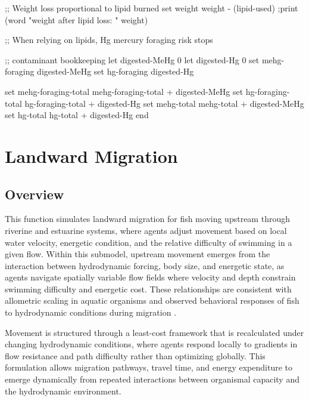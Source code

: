 \documentclass[
]{book}
\newenvironment{Shaded}{\begin{snugshade}}{\end{snugshade}}
\newcommand{\NormalTok}[1]{#1}
\begin{document}
\begin{Shaded}
\begin{Highlighting}[]
\NormalTok{  ;; Weight loss proportional to lipid burned}
\NormalTok{  set weight weight {-} (lipid{-}used)}
\NormalTok{  ;print (word "weight after lipid loss: " weight)}
  
\NormalTok{  ;; When relying on lipids, Hg mercury foraging risk stops}
    
\NormalTok{  ;; contaminant bookkeeping}
\NormalTok{  let digested{-}MeHg 0}
\NormalTok{  let digested{-}Hg 0}
\NormalTok{  set mehg{-}foraging digested{-}MeHg}
\NormalTok{  set hg{-}foraging digested{-}Hg}

\NormalTok{  set mehg{-}foraging{-}total mehg{-}foraging{-}total + digested{-}MeHg}
\NormalTok{  set hg{-}foraging{-}total hg{-}foraging{-}total + digested{-}Hg}
\NormalTok{  set mehg{-}total mehg{-}total + digested{-}MeHg}
\NormalTok{  set hg{-}total hg{-}total + digested{-}Hg}
\NormalTok{ end}
 
\end{Highlighting}
\end{Shaded}

\chapter{Landward Migration}\label{landward-migration}

\section{Overview}\label{overview-7}

This function simulates landward migration for fish moving upstream through riverine and estuarine systems, where agents adjust movement based on local water velocity, energetic condition, and the relative difficulty of swimming in a given flow. Within this submodel, upstream movement emerges from the interaction between hydrodynamic forcing, body size, and energetic state, as agents navigate spatially variable flow fields where velocity and depth constrain swimming difficulty and energetic cost. These relationships are consistent with allometric scaling in aquatic organisms \citep{brown_toward_2004} and observed behavioral responses of fish to hydrodynamic conditions during migration \citep{gibson_selective_2001}.

Movement is structured through a least-cost framework that is recalculated under changing hydrodynamic conditions, where agents respond locally to gradients in flow resistance and path difficulty rather than optimizing globally. This formulation allows migration pathways, travel time, and energy expenditure to emerge dynamically from repeated interactions between organismal capacity and the hydrodynamic environment.
\end{document}
